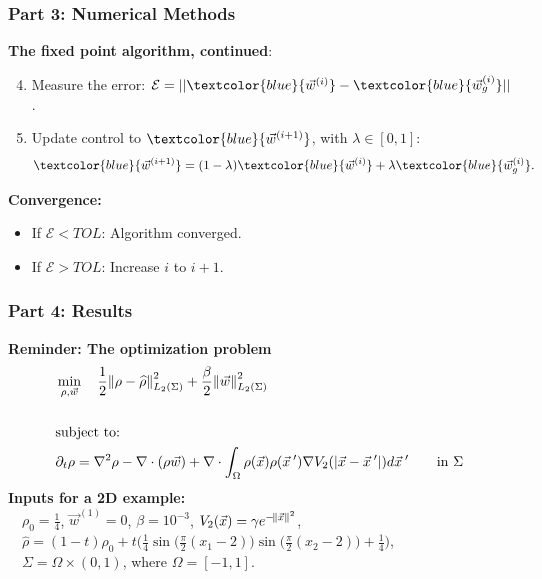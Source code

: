 \documentclass[aspectratio=169,xcolor=dvipsnames]{beamer}
\begin{document}
\begin{frame}
	\frametitle{Part 3: Numerical Methods}
	\textbf{The fixed point algorithm, continued}:\\
    \vspace{0.3cm}
   \begin{enumerate}
   	\setcounter{enumi}{3}
   	\item Measure the error: $\mathcal{E} = ||\textcolor{blue}{\vec{w}^{(i)}} - \textcolor{blue}{\vec{w}^{(i)}_g}||$.
   	\item Update control to $\textcolor{blue}{\vec{w}^{(i+1)}}$, with $\lambda \in [0,1]$:
   	\begin{align*}
   	\textcolor{blue}{\vec{w}^{(i+1)}} = (1-\lambda)\textcolor{blue}{\vec{w}^{(i)}} + \lambda \textcolor{blue}{\vec{w}^{(i)}_g}.
   	\end{align*}
   \end{enumerate}
\vspace{0.5cm}
\textbf{Convergence:}\\
\begin{itemize}
\item If $\mathcal{E} <TOL$: Algorithm converged.
\item If $\mathcal{E} >TOL$: Increase $i$ to $i+1$.
\end{itemize}

\end{frame}
\begin{frame}
	\frametitle{Part 4: Results}

	\textbf{Reminder: The optimization problem}
	\begin{align*}
	&\min_{\rho,\vec{w}} \quad \frac{1}{2}\norm{\rho- \widehat{\rho}}_{L_2(\Sigma)}^2 + \frac{\beta}{2} \norm{\vec{w}}_{L_2(\Sigma)}^2\\
	\\
	&\text{subject to:}
	\\
	& \partial_t \rho = \nabla^2 \rho - \nabla \cdot (\rho \vec{w})+{\nabla \cdot \int_\Omega \rho(\vec{x}) \rho(\vec{x}\hspace{0.2em}') \nabla V_2(|\vec{x}-\vec{x}\hspace{0.2em}'|)d\vec{x}\hspace{0.2em}'} \qquad \text{in    } \Sigma
	\end{align*}
    \textbf{Inputs for a 2D example:}\\
    \vspace{0.2 cm}
    	$ \quad\rho_0 = \frac{1}{4}$, $\vec{w}^{(1)} = 0$, $\beta = 10^{-3}$, $V_2(\vec{x}) = \gamma e^{-{\norm{\vec{x}}}^2}$,\\
	    $\quad\widehat \rho = (1-t)\rho_0 + t\bigg(\frac{1}{4}\sin \bigg(\frac{\pi}{2}(x_1 - 2)\bigg)\sin \bigg(\frac{\pi}{2}(x_2 - 2)\bigg) + \frac{1}{4}\bigg)$,\\	
	    $\quad \Sigma = \Omega \times (0,1)$, where $\Omega = [-1,1]$.
\end{frame}
\end{document}

